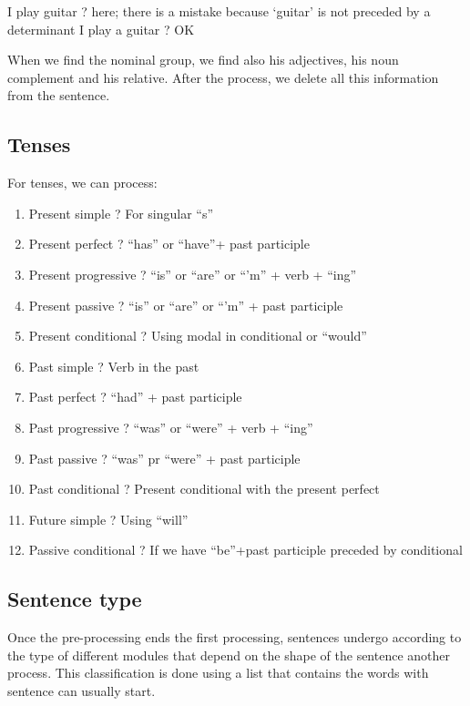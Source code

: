 \documentclass[twoside,a4paper,10pt]{report}
\begin{document}
\small
\begin{verbatimtab}
  I play guitar ? here; there is a mistake because ‘guitar’ is not preceded by a determinant
  I play a guitar ? OK
\end{verbatimtab}
\normalsize
When we find the nominal group, we find also his adjectives, his noun complement and his relative. After the process, we delete all this information from the sentence.


\subsection{Tenses}
\label{7664bb61dad550e6b91636502af4e390}%
For tenses, we can process:


\begin{enumerate}    \item  Present simple ? For singular “s”
    \item  Present perfect ? “has” or “have”+ past participle
    \item  Present progressive ? “is” or “are” or “’m” + verb + “ing”
    \item  Present passive ? “is” or “are” or “’m” + past participle
    \item  Present conditional ? Using modal in conditional or “would”
    \item  Past simple ? Verb in the past
    \item  Past perfect ? “had” + past participle
    \item  Past progressive ? “was” or “were” + verb + “ing”
    \item  Past passive ? “was” pr “were” + past participle
    \item  Past conditional ? Present conditional with the present perfect
    \item  Future simple ? Using “will”
    \item  Passive conditional ? If we have “be”+past participle preceded by conditional
\end{enumerate}

\subsection{Sentence type}
\label{1cae782fdfad8b38f1b3641092175803}%
Once the pre-processing ends the first processing, sentences undergo according to the type of different modules that depend on the shape of the sentence another process. This classification is done using a list that contains the words with sentence can usually start.
\end{document}
